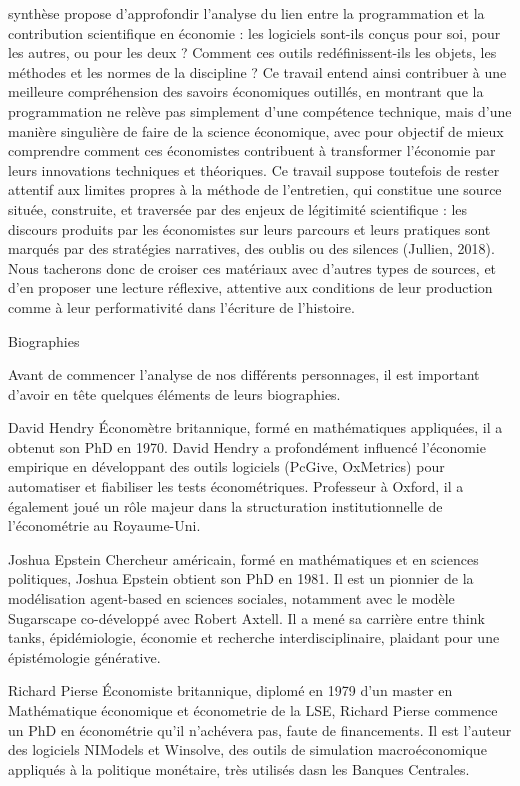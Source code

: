 synthèse propose d’approfondir l’analyse du lien entre la programmation et la contribution scientifique en économie : les logiciels sont-ils conçus pour soi, pour les autres, ou pour les deux ? Comment ces outils redéfinissent-ils les objets, les méthodes et les normes de la discipline ? 
Ce travail entend ainsi contribuer à une meilleure compréhension des savoirs économiques outillés, en montrant que la programmation ne relève pas simplement d’une compétence technique, mais d’une manière singulière de faire de la science économique, avec pour objectif de mieux comprendre comment ces économistes contribuent à transformer l’économie par leurs innovations techniques et théoriques.
Ce travail suppose toutefois de rester attentif aux limites propres à la méthode de l’entretien, qui constitue une source située, construite, et traversée par des enjeux de légitimité scientifique : les discours produits par les économistes sur leurs parcours et leurs pratiques sont marqués par des stratégies narratives, des oublis ou des silences (Jullien, 2018\cite{jullienInterviewsMethodologicalHistoriographical2018}). Nous tacherons donc de croiser ces matériaux avec d’autres types de sources, et d’en proposer une lecture réflexive, attentive aux conditions de leur production comme à leur performativité dans l’écriture de l’histoire.

Biographies

Avant de commencer  l'analyse de nos différents personnages, il est important d'avoir en tête quelques éléments de leurs biographies.

David Hendry
Économètre britannique, formé en mathématiques appliquées, il a obtenut son PhD en 1970. David Hendry a profondément influencé l’économie empirique en développant des outils logiciels (PcGive, OxMetrics) pour automatiser et fiabiliser les tests économétriques. Professeur à Oxford, il a également joué un rôle majeur dans la structuration institutionnelle de l’économétrie au Royaume-Uni.

Joshua Epstein
Chercheur américain, formé en mathématiques et en sciences politiques, Joshua Epstein obtient son PhD en 1981. Il est un pionnier de la modélisation agent-based en sciences sociales, notamment avec le modèle Sugarscape co-développé avec Robert Axtell. Il a mené sa carrière entre think tanks, épidémiologie, économie et recherche interdisciplinaire, plaidant pour une épistémologie générative.

Richard Pierse
Économiste britannique, diplomé en 1979 d'un master en Mathématique économique et économetrie de la LSE, Richard Pierse commence un PhD en économétrie qu'il n'achévera pas, faute de financements. Il est l’auteur des logiciels NIModels et Winsolve, des outils de simulation macroéconomique appliqués à la politique monétaire, très utilisés dasn les Banques Centrales.


